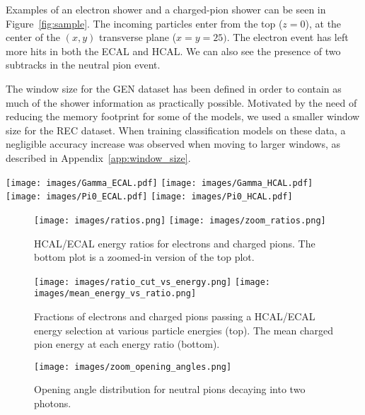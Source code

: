
Examples of an electron shower and a charged-pion shower can be seen in Figure~\ref{fig:sample}. The incoming particles enter from the top ($z=0$), at the center of the $(x,y)$ transverse plane ($x=y=25)$. The electron event has left more hits in both the ECAL and HCAL. We can also see the presence of two subtracks in the neutral pion event. %

The window size for the GEN dataset has been defined in order to contain as much of the shower information as practically possible.  
Motivated by the need of reducing the memory footprint for some of the models, we used a smaller window size for the REC dataset. When training classification models on these data, a negligible accuracy increase was observed when moving to larger windows, as described in Appendix~\ref{app:window_size}.

\begin{figure*}[htbp]
\centering
\texttt{[image: images/Gamma\_ECAL.pdf]}
\texttt{[image: images/Gamma\_HCAL.pdf]} \\
\texttt{[image: images/Pi0\_ECAL.pdf]}
\texttt{[image: images/Pi0\_HCAL.pdf]}
\caption{3D image of a photon (top) and neutral pion (bottom) shower in ECAL (left) and HCAL (right).}
\label{fig:sample}
\end{figure*}


\begin{figure}[htbp]
\centering
\texttt{[image: images/ratios.png]}
\texttt{[image: images/zoom\_ratios.png]}
\caption{HCAL/ECAL energy ratios for electrons and charged pions. The bottom plot is a zoomed-in version of the top plot.}
\label{fig:HE_ratio}
\end{figure}

\begin{figure}[htbp]
\centering
\texttt{[image: images/ratio\_cut\_vs\_energy.png]}
\texttt{[image: images/mean\_energy\_vs\_ratio.png]}
\caption{Fractions of electrons and charged pions passing a HCAL/ECAL energy selection at various particle energies (top). The mean charged pion energy at each energy ratio (bottom).}
\label{fig:HE_ratio_energy}
\end{figure}

\begin{figure}[htbp]
\centering
\texttt{[image: images/zoom\_opening\_angles.png]}
\caption{Opening angle distribution for neutral pions decaying into two photons.}
\label{fig:opening_angle}
\end{figure}

